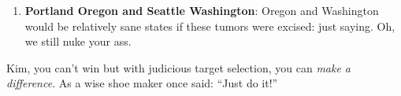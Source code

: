 \begin{enumerate}
  

\item
  \textbf{Portland Oregon and Seattle Washington}: Oregon and Washington
  would be relatively sane states if these tumors were excised: just
  saying. Oh, we still nuke your ass.
\end{enumerate}

Kim, you can't win but with judicious target selection, you can
\emph{make a difference}. As a wise shoe maker once said: ``Just do
it!''


%
 
 
 
